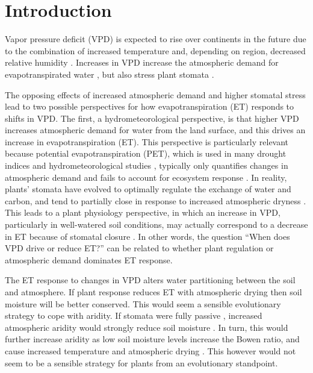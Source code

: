 \documentclass[draft,linenumbers]{agujournal}
\begin{document}
\section{Introduction}

Vapor pressure deficit (VPD) is expected to rise over continents in the future due to the combination of increased temperature and, depending on region, decreased relative humidity \citep{Byrne_2013}. Increases in VPD increase the atmospheric demand for evapotranspirated water \citep{Penman_1948, Monteith_1965}, but also stress plant stomata \citep{Leuning_1990, MEDLYN_2011}.

The opposing effects of increased atmospheric demand and higher stomatal stress lead to two possible perspectives for how evapotranspiration (ET) responds to shifts in VPD. The first, a hydrometeorological perspective, is that higher VPD increases atmospheric demand for water from the land surface, and this drives an increase in evapotranspiration (ET). This perspective is particularly relevant because potential evapotranspiration (PET), which is used in many drought indices and hydrometeorological studies \citep[e.g.,][]{Heim_2002, Scheff_2015}, typically only quantifies changes in atmospheric demand and fails to account for ecosystem response \citep{Swann_2016}. In reality, plants' stomata have evolved to optimally regulate the exchange of water and carbon, and tend to partially close in response to increased atmospheric dryness \citep{Farquhar_1978, Ball_1987, Leuning_1990, MEDLYN_2011}. This leads to a plant physiology perspective, in which an increase in VPD, particularly in well-watered soil conditions, may actually correspond to a decrease in ET because of stomatal closure \citep[e.g.][]{Rigden_2017}.  In other words, the  question ``When does VPD drive or reduce ET?'' can be related to whether plant regulation or atmospheric demand dominates ET response.

The ET response to changes in VPD alters water partitioning between the soil and atmosphere. If plant response reduces ET with atmospheric drying then soil moisture will be better conserved. This would seem a sensible evolutionary strategy to cope with aridity. If stomata were fully passive \citep [similar to soil pores, e.g. ][]{Or_2013}, increased atmospheric aridity would strongly reduce soil moisture \citep{Berg_2017}. In turn, this would further increase aridity as low soil moisture levels increase the Bowen ratio, and cause increased temperature and atmospheric drying \citep[][]{Bouchet_1963, Morton_1965, Brutsaert_1999, Ozdogan_2006, Salvucci_2013, Gentine_2016, Berg_2016}. This however would not seem to be a sensible strategy for plants from an evolutionary standpoint.
\end{document}
